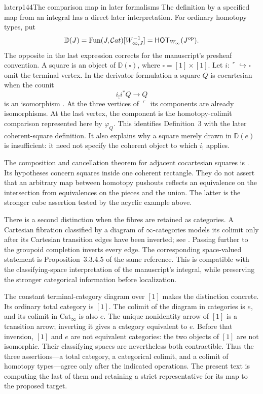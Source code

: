 \begin{enumerate}
\begin{dcomment}{later}{p144}{The comparison map in later formalisms}
The definition by a specified map from an integral has a direct later interpretation. For ordinary homotopy types, put
\[
 \mathbb D(J)=\operatorname{Fun}(J,\mathcal{C}at)[W_{\infty,J}^{-1}]
             =\mathsf{HOT}_{W_\infty}(J^{\mathrm{op}}).
\]
The opposite in the last expression corrects for the manuscript's presheaf convention. A square is an object of $\mathbb D(\square)$, where $\square=[1]\times[1]$. Let $i:\ulcorner\hookrightarrow\square$ omit the terminal vertex. In the derivator formulation a square $Q$ is cocartesian when the counit
\[
                   i_!i^*Q\longrightarrow Q
\]
is an isomorphism \citep[Definition~3.9]{Groth2013}. At the three vertices of $\ulcorner$ its components are already isomorphisms. At the last vertex, the component is the homotopy-colimit comparison represented here by $\varphi_Q$. This identifies Definition~3 with the later coherent-square definition. It also explains why a square merely drawn in $\mathbb D(e)$ is insufficient: it need not specify the coherent object to which $i_!$ applies.

The composition and cancellation theorem for adjacent cocartesian squares is \citet[Proposition~3.13]{Groth2013}. Its hypotheses concern squares inside one coherent rectangle. They do not assert that an arbitrary map between homotopy pushouts reflects an equivalence on the intersection from equivalences on the pieces and the union. The latter is the stronger cube assertion tested by the acyclic example above.

There is a second distinction when the fibres are retained as categories. A Cartesian fibration classified by a diagram of $\infty$-categories models its colimit only after its Cartesian transition edges have been inverted; see \citet[Corollary~3.3.4.3 and Warning~3.3.4.4]{Lurie2009HTT}. Passing further to the groupoid completion inverts every edge. The corresponding space-valued statement is Proposition~3.3.4.5 of the same reference. This is compatible with the classifying-space interpretation of the manuscript's integral, while preserving the stronger categorical information before localization.

The constant terminal-category diagram over $[1]$ makes the distinction concrete. Its ordinary total category is $[1]$. The colimit of the diagram in categories is $e$, and its colimit in $\mathrm{Cat}_\infty$ is also $e$. The unique nonidentity arrow of $[1]$ is a transition arrow; inverting it gives a category equivalent to $e$. Before that inversion, $[1]$ and $e$ are not equivalent categories: the two objects of $[1]$ are not isomorphic. Their classifying spaces are nevertheless both contractible. Thus the three assertions---a total category, a categorical colimit, and a colimit of homotopy types---agree only after the indicated operations. The present text is computing the last of them and retaining a strict representative for its map to the proposed target.
\end{dcomment}



\end{enumerate}
